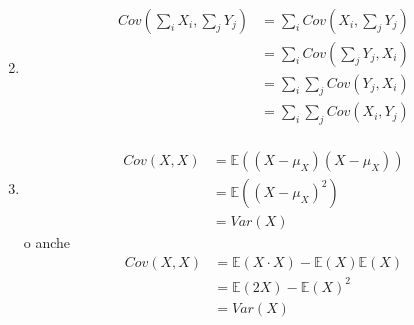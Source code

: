 \documentclass[11pt]{report}
\begin{document}
\begin{enumerate}
\begin{equation}
\begin{split}
            \end{split}
        \end{equation}
	\item
        \begin{equation}
            \begin{split}
                Cov\left(\sum_i X_i, \sum_j Y_j\right) & = \sum_i Cov\left(X_i, \sum_j Y_j\right)\\
        		& = \sum_i Cov\left(\sum_j Y_j, X_i\right)\\
        		& = \sum_i \sum_j Cov(Y_j, X_i)\\
        		& = \sum_i \sum_j Cov(X_i, Y_j)\\
            \end{split}
        \end{equation}
	\item
         \begin{equation}
            \begin{split}
        		Cov(X,X) & = \mathbb{E}((X - \mu_X)(X - \mu_X))\\
                & = \mathbb{E}((X - \mu_X)^2)\\
                & = Var(X)
            \end{split}
        \end{equation}
        o anche
        \begin{equation}
            \begin{split}
        		Cov(X,X) & = \mathbb{E}(X \cdot X) - \mathbb{E}(X)\mathbb{E}(X)\\
                & = \mathbb{E}(2X) - \mathbb{E}(X)^2\\
                & = Var(X)
            \end{split}
        \end{equation}
\end{enumerate}
\end{document}

